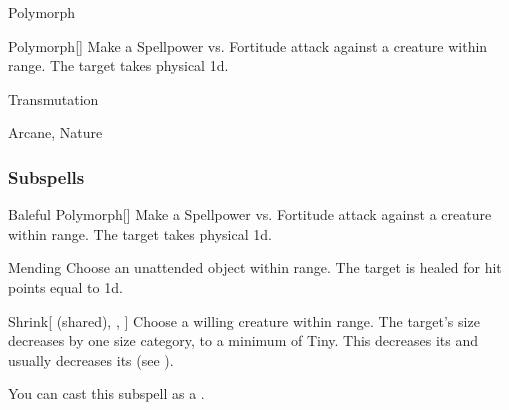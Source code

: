 \newpage
\begin{spellsection}{Polymorph}

\begin{spellheader}
\end{spellheader}


\begin{ability}{Polymorph}[]
Make a Spellpower vs. Fortitude attack against a creature within \rngmed range.
\hit The target takes physical  \minus1d.
\end{ability}




 Transmutation

 Arcane, Nature
\end{spellsection}


\subsubsection{Subspells}


\begin{ability}[\nth{1}]{Baleful Polymorph}[]
Make a Spellpower vs. Fortitude attack against a creature within \rngmed range.
\hit The target takes physical  \plus1d.
\end{ability}
\vspace{0.25em}


\begin{ability}[\nth{1}]{Mending}
Choose an unattended object within \rngclose range.
The target is healed for hit points equal to  \plus1d.
\end{ability}
\vspace{0.25em}


\begin{ability}[\nth{1}]{Shrink}[ (shared), , ]
Choose a willing creature within \rngclose range.
The target's size decreases by one size category, to a minimum of Tiny.
This decreases its  and usually decreases its  (see ).

You can cast this subspell as a .
\end{ability}
\vspace{0.25em}


